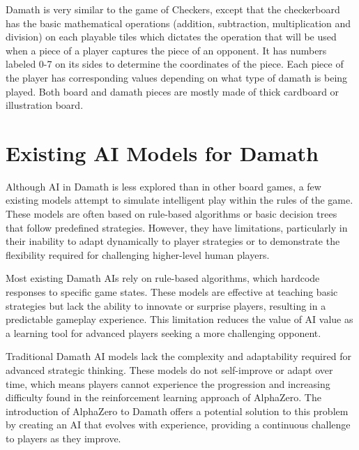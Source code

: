 Damath is very similar to the game of Checkers, except that the checkerboard has the basic mathematical operations (addition, subtraction, multiplication and division) on each playable tiles which dictates the operation that will be used when a piece of a player captures the piece of an opponent. It has numbers labeled 0-7 on its sides to determine the coordinates of the piece. Each piece of the player has corresponding values depending on what type of damath is being played. Both board and damath pieces are mostly made of thick cardboard or illustration board.

\section{Existing AI Models for Damath}

Although AI in Damath is less explored than in other board games, a few existing models attempt to simulate intelligent play within the rules of the game. These models are often based on rule-based algorithms or basic decision trees that follow predefined strategies. However, they have limitations, particularly in their inability to adapt dynamically to player strategies or to demonstrate the flexibility required for challenging higher-level human players.

Most existing Damath AIs rely on rule-based algorithms, which hardcode responses to specific game states. These models are effective at teaching basic strategies but lack the ability to innovate or surprise players, resulting in a predictable gameplay experience. This limitation reduces the value of AI value as a learning tool for advanced players seeking a more challenging opponent.

Traditional Damath AI models lack the complexity and adaptability required for advanced strategic thinking. These models do not self-improve or adapt over time, which means players cannot experience the progression and increasing difficulty found in the reinforcement learning approach of AlphaZero. The introduction of AlphaZero to Damath offers a potential solution to this problem by creating an AI that evolves with experience, providing a continuous challenge to players as they improve.